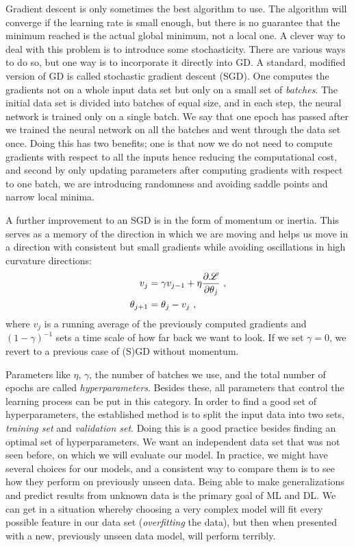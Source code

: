 Gradient descent is only sometimes the best algorithm to use. The algorithm will converge if the learning rate is small enough, but there is no guarantee that the minimum reached is the actual global minimum, not a local one. A clever way to deal with this problem is to introduce some stochasticity. There are various ways to do so, but one way is to incorporate it directly into GD. A standard, modified version of GD is called stochastic gradient descent (SGD). One computes the gradients not on a whole input data set but only on a small set of \textit{batches}. The initial data set is divided into batches of equal size, and in each step, the neural network is trained only on a single batch. We say that one epoch has passed after we trained the neural network on all the batches and went through the data set once. Doing this has two benefits; one is that now we do not need to compute gradients with respect to all the inputs hence reducing the computational cost, and second by only updating parameters after computing gradients with respect to one batch, we are introducing randomness and avoiding saddle points and narrow local minima.  
\par
A further improvement to an SGD is in the form of momentum or inertia. This serves as a memory of the direction in which we are moving and helps us move in a direction with consistent but small gradients while avoiding oscillations in high curvature directions:
\begin{align}
	v_j &= \gamma v_{j-1} + \eta \pdv{\mathcal{L}}{\theta_j} \ , \\
	\theta_{j+1} &= \theta_j - v_j \ ,
\end{align}
where $v_j$ is a running average of the previously computed gradients and $(1-\gamma)^{-1}$ sets a time scale of how far back we want to look. If we set $\gamma=0$, we revert to a previous case of (S)GD without momentum. 
\par
Parameters like $\eta$, $\gamma$, the number of batches we use, and the total number of epochs are called \textit{hyperparameters}. Besides these, all parameters that control the learning process can be put in this category. In order to find a good set of hyperparameters, the established method is to split the input data into two sets, \textit{training set} and \textit{validation set}. Doing this is a good practice besides finding an optimal set of hyperparameters. We want an independent data set that was not seen before, on which we will evaluate our model. In practice, we might have several choices for our models, and a consistent way to compare them is to see how they perform on previously unseen data. Being able to make generalizations and predict results from unknown data is the primary goal of ML and DL. We can get in a situation whereby choosing a very complex model will fit every possible feature in our data set (\textit{overfitting} the data), but then when presented with a new, previously unseen data model, will perform terribly.
